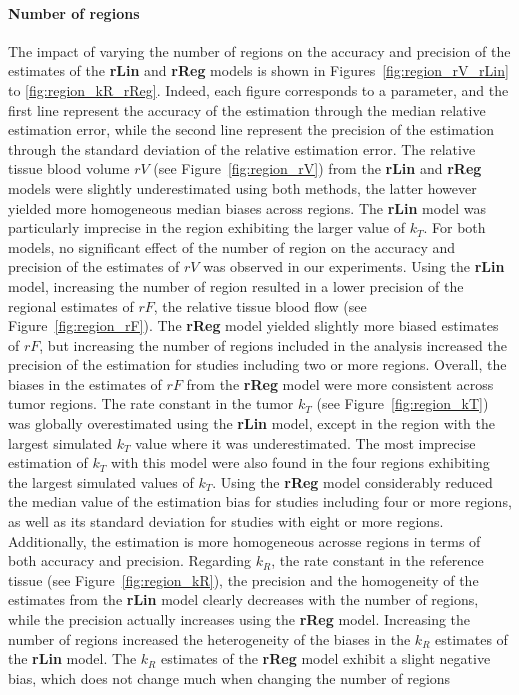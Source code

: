 \paragraph{Number of regions}
The impact of varying the number of regions on the accuracy and precision of the estimates of the \textbf{rLin} and \textbf{rReg} models is shown in Figures~\ref{fig:region_rV_rLin} to \ref{fig:region_kR_rReg}.
Indeed, each figure corresponds to a parameter, and the first line represent the accuracy of the estimation through the median relative estimation error, while the second line represent the precision of the estimation through the standard deviation of the relative estimation error.
The relative tissue blood volume $rV$ (see Figure~\ref{fig:region_rV}) from the \textbf{rLin} and \textbf{rReg} models were slightly underestimated using both methods, the latter however yielded more homogeneous median biases across regions.
The \textbf{rLin} model was particularly imprecise in the region exhibiting the larger value of $k_T$.
For both models, no significant effect of the number of region on the accuracy and precision of the estimates of $rV$ was observed in our experiments.
Using the \textbf{rLin} model, increasing the number of region resulted in a lower precision of the regional estimates of $rF$, the relative tissue blood flow (see Figure~\ref{fig:region_rF}).
The \textbf{rReg} model yielded slightly more biased estimates of $rF$, but increasing the number of regions included in the analysis increased the precision of the estimation for studies including two or more regions.
Overall, the biases in the estimates of $rF$ from the \textbf{rReg} model were more consistent across tumor regions.
The rate constant in the tumor $k_T$ (see Figure~\ref{fig:region_kT}) was globally overestimated using the \textbf{rLin} model, except in the region with the largest simulated $k_T$ value where it was underestimated.
The most imprecise estimation of $k_T$ with this model were also found in the four regions exhibiting the largest simulated values of $k_T$.
Using the \textbf{rReg} model considerably reduced the median value of the estimation bias for studies including four or more regions, as well as its standard deviation for studies with eight or more regions.
Additionally, the estimation is more homogeneous acrosse regions in terms of both accuracy and precision.
Regarding $k_R$, the rate constant in the reference tissue (see Figure~\ref{fig:region_kR}), the precision and the homogeneity of the estimates from the \textbf{rLin} model clearly decreases with the number of regions, while the precision actually increases using the \textbf{rReg} model. 
Increasing the number of regions increased the heterogeneity of the biases in the $k_R$ estimates of the \textbf{rLin} model.
The $k_R$ estimates of the \textbf{rReg} model exhibit a slight negative bias, which does not change much when changing the number of regions

